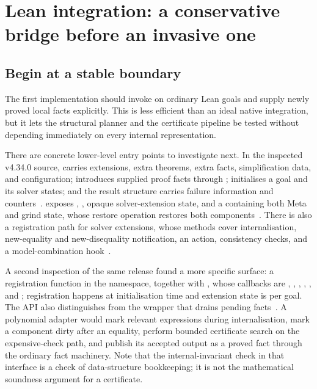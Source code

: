 \section{Lean integration: a conservative bridge before an invasive one}
\label{sec:integration}

\subsection{Begin at a stable boundary}

The first implementation should invoke \grind{} on ordinary Lean goals and
supply newly proved local facts explicitly. This is less efficient than an ideal
native integration, but it lets the structural planner and the certificate
pipeline be tested without depending immediately on every internal
representation.

There are concrete lower-level entry points to investigate next. In the
inspected v4.34.0 source,  carries extensions,
extra theorems, extra facts, simplification data, and configuration;
 introduces supplied proof facts through
;  initialises a goal and its solver
states; and the result structure carries failure information and
counters~\cite{grind-main}.  exposes
, , opaque solver-extension state, and a
 containing both Meta and grind state, whose restore operation
restores both components~\cite{grind-types}. There is also a registration path
for solver extensions, whose methods cover internalisation, new-equality and
new-disequality notification, an action, consistency checks, and a
model-combination hook~\cite{grind-api}.

A second inspection of the same release found a more specific surface: a
registration function  in the
 namespace, together with
, whose callbacks are ,
, , , ,  and
; registration happens at initialisation time and extension state
is per goal. The API also distinguishes  from the
wrapper that drains pending facts~\cite{grind-api}. A polynomial adapter would
mark relevant expressions during internalisation, mark a component dirty after
an equality, perform bounded certificate search on the expensive-check path, and
publish its accepted output as a proved fact through the ordinary fact
machinery. Note that the internal-invariant check in that interface is a check
of data-structure bookkeeping; it is not the mathematical soundness argument for
a certificate.

